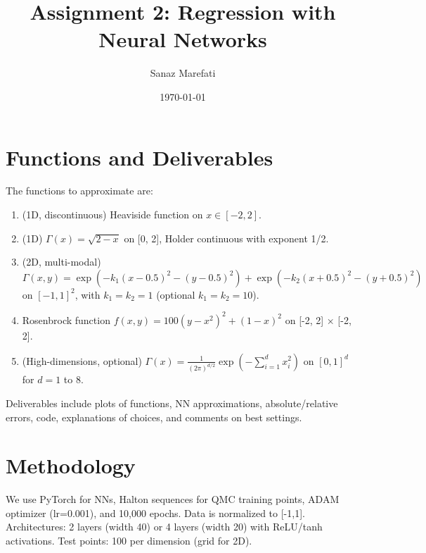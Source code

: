 \documentclass[a4paper,12pt]{article}
\title{Assignment 2: Regression with Neural Networks}
\author{Sanaz Marefati}
\date{\today}
\begin{document}
\maketitle

\section{Functions and Deliverables}
The functions to approximate are:
\begin{enumerate}
\item (1D, discontinuous) Heaviside function on $ x \in [-2, 2] $.
\item (1D) $ \Gamma(x) = \sqrt{2 - x} $ on [0, 2], Holder continuous with exponent 1/2.
\item (2D, multi-modal) $ \Gamma(x, y) = \exp(-k_1 (x - 0.5)^2 - (y - 0.5)^2) + \exp(-k_2 (x + 0.5)^2 - (y + 0.5)^2) $ on $ [-1, 1]^2 $, with $ k_1 = k_2 = 1 $ (optional $ k_1 = k_2 = 10 $).
\item Rosenbrock function $ f(x, y) = 100 (y - x^2)^2 + (1 - x)^2 $ on [-2, 2] × [-2, 2].
\item (High-dimensions, optional) $ \Gamma(x) = \frac{1}{(2\pi)^{d/2}} \exp\left(-\sum_{i=1}^d x_i^2\right) $ on $[0, 1]^d$ for $d = 1$ to 8.
\end{enumerate}
Deliverables include plots of functions, NN approximations, absolute/relative errors, code, explanations of choices, and comments on best settings.
\section{Methodology}
We use PyTorch for NNs, Halton sequences for QMC training points, ADAM optimizer (lr=0.001), and 10,000 epochs. Data is normalized to [-1,1]. Architectures: 2 layers (width 40) or 4 layers (width 20) with ReLU/tanh activations. Test points: 100 per dimension (grid for 2D).
\end{document}
